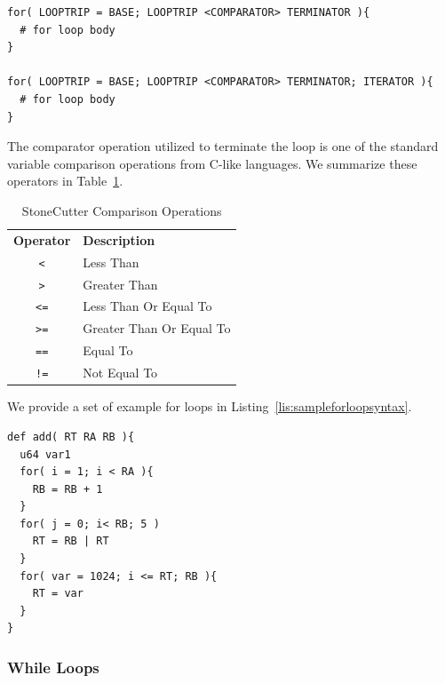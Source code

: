 \documentclass{article}
\begin{document}
\vspace{0.125in}
\begin{lstlisting}[frame=single,style=base,caption={For Loop Syntax},captionpos=b,label={lis:forloopsyntax}]
for( LOOPTRIP = BASE; LOOPTRIP <COMPARATOR> TERMINATOR ){
  # for loop body
}

for( LOOPTRIP = BASE; LOOPTRIP <COMPARATOR> TERMINATOR; ITERATOR ){
  # for loop body
}
\end{lstlisting}

The comparator operation utilized to terminate the loop is one of the standard 
variable comparison operations from C-like languages.  We summarize these operators in 
Table~\ref{tab:compreops}.  

\begin{table}[h]
\begin{center}
\caption{StoneCutter Comparison Operations}
\vspace{0.125in}
\label{tab:compreops}
\begin{tabular}{|c|l|}
\hline
\textbf{Operator} & \textbf{Description} \\
\texttt{<} & Less Than\\
\hline
\texttt{>} & Greater Than\\
\hline
\texttt{<=} & Less Than Or Equal To\\
\hline
\texttt{>=} & Greater Than Or Equal To\\
\hline
\texttt{==} & Equal To\\
\hline
\texttt{!=} & Not Equal To\\
\hline
\end{tabular}
\end{center}
\end{table}

We provide a set of example for loops in Listing~\ref{lis:sampleforloopsyntax}.  

\vspace{0.125in}
\begin{lstlisting}[frame=single,style=base,caption={Sample For Loop Syntax},captionpos=b,label={lis:sampleforloopsyntax}]
def add( RT RA RB ){
  u64 var1
  for( i = 1; i < RA ){
    RB = RB + 1
  }
  for( j = 0; i< RB; 5 )
    RT = RB | RT
  }
  for( var = 1024; i <= RT; RB ){
    RT = var
  }
}
\end{lstlisting}

\subsubsection{While Loops}
\label{sec:WhileLoops}
\end{document}
